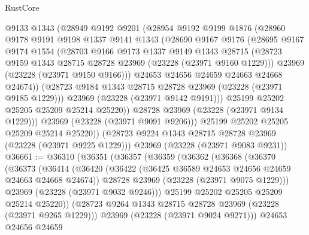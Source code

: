 \begin{lexlean}{RustCore}
\begin{coremodule}
            @9133
            @1343
            (@28949
              @9192
              @9201
              (@28954
                @9192
                @9199
                @1876
                (@28960
                  @9178
                  @9191
                  @9198
                  @1337
                  @9141
                  @1343
                  (@28690
                    @9167
                    @9176
                    (@28695
                      @9167
                      @9174
                      @1554
                      (@28703
                        @9166
                        @9173
                        @1337
                        @9149
                        @1343
                        @28715
                        (@28723 @9159 @1343 @28715 @28728 @23969 (@23228 (@23971 @9160 @1229)))
                        @23969
                        (@23228 (@23971 @9150 @9166)))
                      @24653
                      @24656
                      @24659
                      @24663
                      @24668
                      @24674))
                  (@28723 @9184 @1343 @28715 @28728 @23969 (@23228 (@23971 @9185 @1229)))
                  @23969
                  (@23228 (@23971 @9142 @9191)))
                @25199
                @25202
                @25205
                @25209
                @25214
                @25220))
            @28728
            @23969
            (@23228 (@23971 @9134 @1229)))
          @23969
          (@23228 (@23971 @9091 @9206)))
        @25199
        @25202
        @25205
        @25209
        @25214
        @25220))
    (@28723 @9224 @1343 @28715 @28728 @23969 (@23228 (@23971 @9225 @1229)))
    @23969
    (@23228 (@23971 @9083 @9231))
@36661 := @36310
    (@36351
      (@36357
        (@36359
          (@36362
            (@36368
              (@36370
                (@36373
                  (@36414
                    (@36420
                      (@36422 (@36425 @36589 @24653 @24656 @24659 @24663 @24668 @24674))
                      @28728
                      @23969
                      (@23228 (@23971 @9075 @1229)))
                    @23969
                    (@23228 (@23971 @9032 @9246)))
                  @25199
                  @25202
                  @25205
                  @25209
                  @25214
                  @25220))
              (@28723 @9264 @1343 @28715 @28728 @23969 (@23228 (@23971 @9265 @1229)))
              @23969
              (@23228 (@23971 @9024 @9271)))
            @24653
            @24656
            @24659

\end{coremodule}
\end{lexlean}
